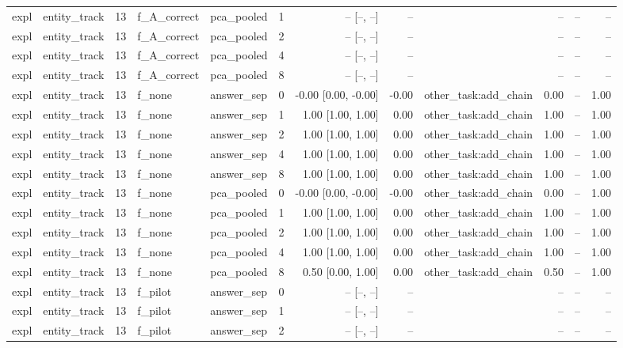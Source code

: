 \begin{tabular}{llrllrrrlrrr}
expl & entity\_track & 13 & f\_A\_correct & pca\_pooled & 1 & -- [--, --] & -- &  & -- & -- & -- \\
expl & entity\_track & 13 & f\_A\_correct & pca\_pooled & 2 & -- [--, --] & -- &  & -- & -- & -- \\
expl & entity\_track & 13 & f\_A\_correct & pca\_pooled & 4 & -- [--, --] & -- &  & -- & -- & -- \\
expl & entity\_track & 13 & f\_A\_correct & pca\_pooled & 8 & -- [--, --] & -- &  & -- & -- & -- \\
expl & entity\_track & 13 & f\_none & answer\_sep & 0 & -0.00 [0.00, -0.00] & -0.00 & other\_task:add\_chain & 0.00 & -- & 1.00 \\
expl & entity\_track & 13 & f\_none & answer\_sep & 1 & 1.00 [1.00, 1.00] & 0.00 & other\_task:add\_chain & 1.00 & -- & 1.00 \\
expl & entity\_track & 13 & f\_none & answer\_sep & 2 & 1.00 [1.00, 1.00] & 0.00 & other\_task:add\_chain & 1.00 & -- & 1.00 \\
expl & entity\_track & 13 & f\_none & answer\_sep & 4 & 1.00 [1.00, 1.00] & 0.00 & other\_task:add\_chain & 1.00 & -- & 1.00 \\
expl & entity\_track & 13 & f\_none & answer\_sep & 8 & 1.00 [1.00, 1.00] & 0.00 & other\_task:add\_chain & 1.00 & -- & 1.00 \\
expl & entity\_track & 13 & f\_none & pca\_pooled & 0 & -0.00 [0.00, -0.00] & -0.00 & other\_task:add\_chain & 0.00 & -- & 1.00 \\
expl & entity\_track & 13 & f\_none & pca\_pooled & 1 & 1.00 [1.00, 1.00] & 0.00 & other\_task:add\_chain & 1.00 & -- & 1.00 \\
expl & entity\_track & 13 & f\_none & pca\_pooled & 2 & 1.00 [1.00, 1.00] & 0.00 & other\_task:add\_chain & 1.00 & -- & 1.00 \\
expl & entity\_track & 13 & f\_none & pca\_pooled & 4 & 1.00 [1.00, 1.00] & 0.00 & other\_task:add\_chain & 1.00 & -- & 1.00 \\
expl & entity\_track & 13 & f\_none & pca\_pooled & 8 & 0.50 [0.00, 1.00] & 0.00 & other\_task:add\_chain & 0.50 & -- & 1.00 \\
expl & entity\_track & 13 & f\_pilot & answer\_sep & 0 & -- [--, --] & -- &  & -- & -- & -- \\
expl & entity\_track & 13 & f\_pilot & answer\_sep & 1 & -- [--, --] & -- &  & -- & -- & -- \\
expl & entity\_track & 13 & f\_pilot & answer\_sep & 2 & -- [--, --] & -- &  & -- & -- & -- \\

\end{tabular}
